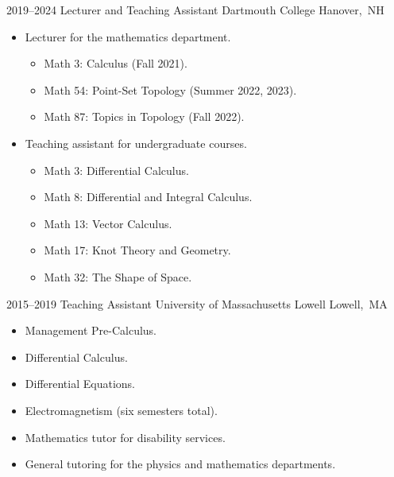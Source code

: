 \documentclass[letterpaper,sans]{moderncv}
\begin{document}
        \cventry%
            {2019--2024}
            {Lecturer and Teaching Assistant}
            {Dartmouth College}
            {\mbox{Hanover, NH}}
            {}
            {%
                \begin{itemize}
                    \item
                        Lecturer for the mathematics department.
                        \begin{itemize}
                            \item
                                Math 3: Calculus (Fall 2021).
                            \item
                                Math 54: Point-Set Topology
                                (Summer 2022, 2023).
                            \item
                                Math 87: Topics in Topology (Fall 2022).
                        \end{itemize}
                    \item
                        Teaching assistant for undergraduate courses.
                        \begin{itemize}
                            \item
                                Math 3: Differential Calculus.
                            \item
                                Math 8: Differential and Integral Calculus.
                            \item
                                Math 13: Vector Calculus.
                            \item
                                Math 17: Knot Theory and Geometry.
                            \item
                                Math 32: The Shape of Space.
                        \end{itemize}
                \end{itemize}
            }
        \cventry%
            {2015--2019}
            {Teaching Assistant}
            {University of Massachusetts Lowell}
            {\mbox{Lowell, MA}}
            {}
            {%
                \begin{itemize}
                    \item
                        Management Pre-Calculus.
                    \item
                        Differential Calculus.
                    \item
                        Differential Equations.
                    \item
                        Electromagnetism (six semesters total).
                    \item
                        Mathematics tutor for disability services.
                    \item
                        General tutoring for the physics and mathematics
                        departments.
                \end{itemize}%
            }
\end{document}
